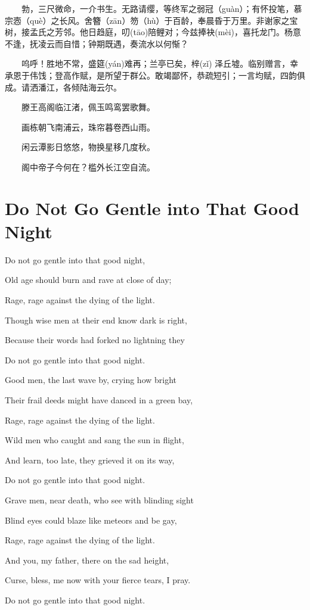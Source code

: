 \documentclass[fontset=none]{ctexart}
\begin{document}
　　勃，三尺微命，一介书生。无路请缨，等终军之弱冠（guàn）；有怀投笔，慕宗悫（què）之长风。舍簪（zān）笏（hù）于百龄，奉晨昏于万里。非谢家之宝树，接孟氏之芳邻。他日趋庭，叨(tāo)陪鲤对；今兹捧袂(mèi)，喜托龙门。杨意不逢，抚凌云而自惜；钟期既遇，奏流水以何惭？

　　呜呼！胜地不常，盛筵(yán)难再；兰亭已矣，梓(zǐ) 泽丘墟。临别赠言，幸承恩于伟饯；登高作赋，是所望于群公。敢竭鄙怀，恭疏短引；一言均赋，四韵俱成。请洒潘江，各倾陆海云尔。　

　　滕王高阁临江渚，佩玉鸣鸾罢歌舞。

　　画栋朝飞南浦云，珠帘暮卷西山雨。

　　闲云潭影日悠悠，物换星移几度秋。

　　阁中帝子今何在？槛外长江空自流。

\section{Do Not Go Gentle into That Good Night}

Do not go gentle into that good night,

Old age should burn and rave at close of day;

Rage, rage against the dying of the light.

Though wise men at their end know dark is right,

Because their words had forked no lightning they

Do not go gentle into that good night.

Good men, the last wave by, crying how bright

Their frail deeds might have danced in a green bay,

Rage, rage against the dying of the light.

Wild men who caught and sang the sun in flight,

And learn, too late, they grieved it on its way,

Do not go gentle into that good night.

Grave men, near death, who see with blinding sight

Blind eyes could blaze like meteors and be gay,   

Rage, rage against the dying of the light.

And you, my father, there on the sad height,

Curse, bless, me now with your fierce tears, I pray.

Do not go gentle into that good night.
\end{document}
